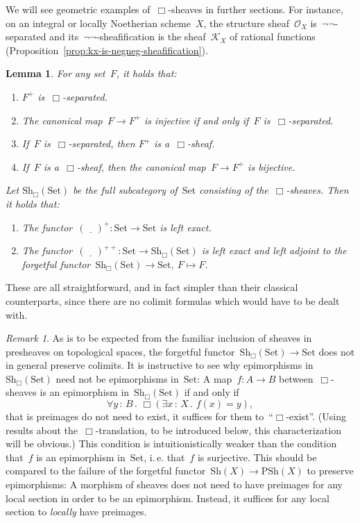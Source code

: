 \documentclass[10pt,reqno,a4paper]{amsbook}
\makeatletter
\theoremstyle{definition}
\theoremstyle{plain}
\newtheorem{lemma}[defn]{Lemma}
\theoremstyle{remark}
\newtheorem{rem}[defn]{Remark}
\renewcommand{\O}{\mathcal{O}}
\newcommand{\K}{\mathcal{K}}
\newcommand{\placeholder}{\underline{\quad}}
\newcommand{\Set}{\mathrm{Set}}
\newcommand{\Sh}{\mathrm{Sh}}
\newcommand{\PSh}{\mathrm{PSh}}
\newcommand{\?}{\,{:}\,}
\renewcommand{\_}{\mathpunct{.}\,}
\newcommand{\ie}{i.\,e.\@\xspace}
\renewenvironment{proof}[1][\proofname]{\par
  \pushQED{\qed}%
  \normalfont \topsep6\p@\@plus6\p@\relax
  \trivlist
  \item[\hskip\labelsep
        \itshape
    #1\@addpunct{.}]\ignorespaces
}{%
  \popQED\endtrivlist\@endpefalse
}
\makeatother
\begin{document}
We will see geometric examples of~$\Box$-sheaves in further sections.
For instance, on an integral or locally Noetherian scheme~$X$, the structure sheaf~$\O_X$
is~$\neg\neg$-separated and its~$\neg\neg$-sheafification is the sheaf~$\K_X$
of rational functions (Proposition~\ref{prop:kx-is-negneg-sheafification}).

\begin{lemma}For any set~$F$, it holds that: \begin{enumerate}
\item $F^+$ is~$\Box$-separated.
\item The canonical map~$F \to F^+$ is injective if and only if~$F$
is~$\Box$-separated.
\item If~$F$ is~$\Box$-separated, then $F^+$ is a~$\Box$-sheaf.
\item If~$F$ is a~$\Box$-sheaf, then the canonical map~$F \to F^+$ is bijective.
\end{enumerate}
Let $\Sh_\Box(\Set)$ be the full subcategory of~$\Set$ consisting of
the~$\Box$-sheaves. Then it holds that:
\begin{enumerate}
\addtocounter{enumi}{4}
\item The functor~$(\placeholder)^+ : \Set \to \Set$ is left exact.
\item The functor~$(\placeholder)^{++} : \Set \to \Sh_\Box(\Set)$ is left exact and left
adjoint to the forgetful functor~$\Sh_\Box(\Set) \to \Set,\ F \mapsto F$.
\end{enumerate}\end{lemma}
\begin{proof}These are all straightforward, and in fact simpler than their
classical counterparts, since there are no colimit formulas which would have to
be dealt with.
\end{proof}

\begin{rem}\label{rem:epi-in-box-sheaves}
As is to be expected from the familiar inclusion of sheaves in
presheaves on topological spaces, the forgetful functor~$\Sh_\Box(\Set) \to \Set$
does not in general preserve colimits. It is instructive to see why
epimorphisms in~$\Sh_\Box(\Set)$ need not be epimorphisms in~$\Set$: A map~$f:A
\to B$ between~$\Box$-sheaves is an epimorphism in~$\Sh_\Box(\Set)$ if and only
if
\[ \forall y\?B\_ \Box(\exists x\?X\_ f(x) = y), \]
that is preimages do not need to exist, it suffices for them to~``$\Box$-exist''.
(Using results about the~$\Box$-translation, to be introduced below, this
characterization will be obvious.) This condition is intuitionistically weaker
than the condition that~$f$ is an epimorphism in~$\Set$, \ie that~$f$ is
surjective. This should be compared to the failure of the forgetful functor~$\Sh(X)
\to \PSh(X)$ to preserve epimorphisms: A morphism of sheaves does not need to
have preimages for any local section in order to be an epimorphism. Instead, it
suffices for any local section to \emph{locally} have preimages.\end{rem}
\end{document}
